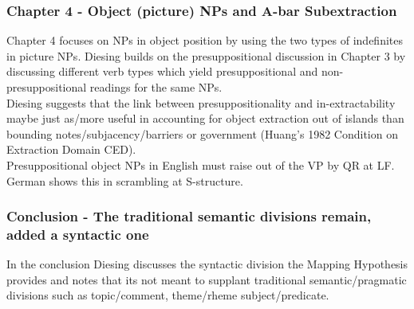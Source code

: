 \documentclass[landscape]{article}
\begin{document}
\subsubsection{Chapter 4 - Object (picture) NPs and A-bar Subextraction}

Chapter 4 focuses on NPs in object position by using the two types of indefinites in picture NPs. Diesing builds on the presuppositional  discussion in Chapter 3 by discussing different verb types which yield presuppositional and non-presuppositional readings for the same NPs.\\

Diesing suggests that the link between presuppositionality and in-extractability maybe just as/more useful in accounting for object extraction out of islands than bounding notes/subjacency/barriers or government (Huang's 1982  Condition on Extraction Domain CED). \\

Presuppositional object NPs in English must raise out of the VP by QR at LF. German shows this in scrambling at S-structure.
	
\subsubsection{Conclusion - The traditional semantic divisions remain, added a syntactic one}
In the conclusion Diesing discusses the syntactic division the Mapping Hypothesis provides and notes that its not meant to supplant traditional semantic/pragmatic divisions such as topic/comment, theme/rheme subject/predicate.
\end{document}
